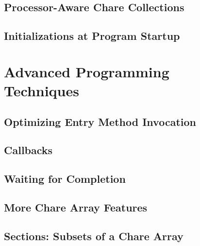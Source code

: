 \documentclass[10pt]{report}
\begin{document}
\chapter{Processor-Aware Chare Collections}
  
  

\chapter{Initializations at Program Startup}
  

\part{Advanced Programming Techniques}

\chapter{Optimizing Entry Method Invocation}
  
  
  

\chapter{Callbacks}
  

\chapter{Waiting for Completion}
  
  
  
  

\chapter{More Chare Array Features}
\label{advanced arrays}
  

\chapter{Sections: Subsets of a Chare Array}
\label{array section}
  

%  
\end{document}
